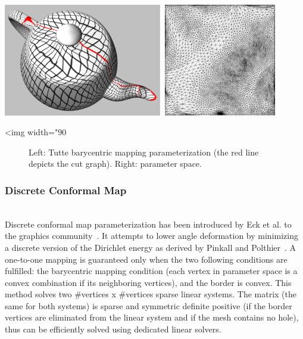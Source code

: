 \begin{center}
    \label{Surface_mesh_parameterization-fig-uniform}
    \begin{ccTexOnly}
      \includegraphics[width=0.9\textwidth]{Surface_mesh_parameterization/uniform}
    \end{ccTexOnly}
    \begin{ccHtmlOnly}
        <img width="90%
    \end{ccHtmlOnly}
    \begin{figure}[ht]
        \caption{Left: Tutte barycentric mapping parameterization (the red
                 line depicts the cut graph). Right: parameter space.}
    \end{figure}
\end{center}


\subsubsection{Discrete Conformal Map}

  \\

Discrete conformal map parameterization has been introduced by Eck et
al. to the graphics community~\cite{cgal:eddhls-maam-95}. It attempts to
lower angle deformation by minimizing a discrete version of the
Dirichlet energy as derived by Pinkall and
Polthier~\cite{cgal:pp-cdmsc-93}. A one-to-one mapping is guaranteed
only when the two following conditions are fulfilled: the barycentric mapping
condition (each vertex in parameter space is a convex combination if
its neighboring vertices), and the border is convex.
This method solves two \#vertices x \#vertices sparse linear
systems. The matrix (the same for both systems) is sparse and symmetric definite
positive (if the border vertices are eliminated from the linear system
and if the mesh contains no hole),
thus can be efficiently solved using dedicated linear solvers.

